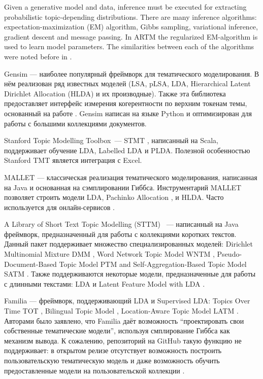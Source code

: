 Given a generative model and data, inference must be executed for extracting probabilistic topic-depending distributions. There are many inference algorithms: expectation-maximization (EM) algorithm, Gibbs sampling, variational inference, gradient descent and message passing. In ARTM the regularized EM-algorithm is used to learn model parameters. The similarities between each of the algorithms were noted before in \cite{asuncion09smoothing}. 

Gensim \cite{rehurek_lrec} --- наиболее популярный фреймворк для тематического моделирования. В нём реализован ряд известных моделей (LSA, pLSA, LDA, Hierarchical Latent Dirichlet Allocation (HLDA) и их производные). Также эта библиотека предоставляет интерфейс измерения когерентности по верхним токенам темы, основанный на работе \cite{roder2015exploring}. Gensim написан на языке Python и оптимизирован для работы с большими коллекциями документов. 

Stanford Topic Modelling Toolbox~--- STMT \cite{stanfordtmt}, написанный на Scala, поддерживает обучение LDA, Labelled LDA и PLDA. Полезной особенностью Stanford TMT является интеграция с Excel.

MALLET \cite{mccallum2002mallet} --- классическая реализация тематического моделирования, написанная на Java и основанная на сэмплировании Гиббса. 
Инструментарий MALLET позволяет строить модели LDA, Pachinko Allocation \cite{li2006pachinko}, и HLDA. Часто используется для онлайн-сервисов \cite{pol2017towards}.

A Library of Short Text Topic Modelling (STTM) \cite{qiang2018sttm} ~--- написанный на Java фреймворк, предназначенный для работы с коллекциями коротких текстов. Данный пакет поддерживает множество специализированных моделей: Dirichlet Multinomial Mixture DMM \cite{yin2014dirichlet}, Word Network Topic Model WNTM \cite{zuo2016word}, Pseudo-Document-Based Topic Model PTM \cite{zuo2016topic} and Self-Aggregation-Based Topic Model SATM \cite{quan2015short}. Также поддерживаются некоторые модели, предназначенные для работы с длинными текстами: LDA и Latent Feature Model with LDA \cite{nguyen2015improving}.

Familia \cite{jiang2018familia} --- фреймворк, поддерживающий LDA и Supervised LDA: Topics Over Time TOT \cite{wang2006topics}, Bilingual Topic Model \cite{gao2011clickthrough}, Location-Aware Topic Model LATM \cite{wang2007mining}. Авторами было заявлено, что Familia даёт возможность ``проектировать свои собственные тематические модели'', используя смплирование Гиббса как механизм вывода. К сожалению, репозиторий на GitHub такую функцию не поддерживает: в открытом релизе отсутствует возможность построить пользовательскую тематическую модель и даже возможность обучить предоставленные модели на пользовательской коллекции \cite{familia_github}.

